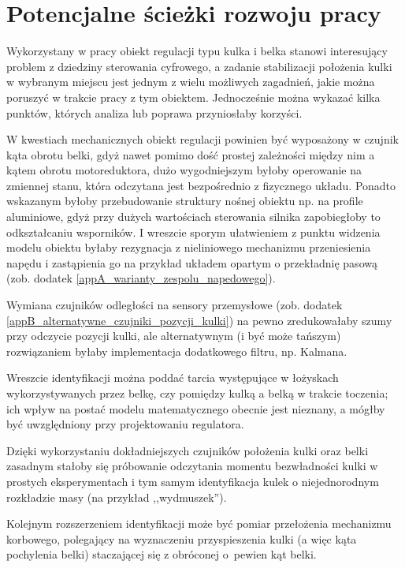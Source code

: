 \section{Potencjalne ścieżki rozwoju pracy}

Wykorzystany w pracy obiekt regulacji typu kulka i belka stanowi interesujący problem z dziedziny sterowania cyfrowego, a zadanie stabilizacji położenia kulki w wybranym miejscu jest jednym z wielu możliwych zagadnień, jakie można poruszyć w trakcie pracy z tym obiektem. Jednocześnie można wykazać kilka punktów, których analiza lub poprawa przyniosłaby korzyści.

W kwestiach mechanicznych obiekt regulacji powinien być wyposażony w czujnik kąta obrotu belki, gdyż nawet pomimo dość prostej zależności między nim a kątem obrotu motoreduktora, dużo wygodniejszym byłoby operowanie na zmiennej stanu, która odczytana jest bezpośrednio z fizycznego układu. Ponadto wskazanym byłoby przebudowanie struktury nośnej obiektu np. na profile aluminiowe, gdyż przy dużych wartościach sterowania silnika zapobiegłoby to odkształcaniu wsporników. I wreszcie sporym ułatwieniem z punktu widzenia modelu obiektu byłaby rezygnacja z nieliniowego mechanizmu przeniesienia napędu i zastąpienia go na przykład układem opartym o przekładnię pasową (zob. dodatek \ref{appA_warianty_zespolu_napedowego}).

Wymiana czujników odległości na sensory przemysłowe (zob. dodatek \ref{appB_alternatywne_czujniki_pozycji_kulki}) na pewno zredukowałaby szumy przy odczycie pozycji kulki, ale alternatywnym (i być może tańszym) rozwiązaniem byłaby implementacja dodatkowego filtru, np. Kalmana.

Wreszcie identyfikacji można poddać tarcia występujące w łożyskach wykorzystywanych przez belkę, czy pomiędzy kulką a belką w trakcie toczenia; ich wpływ na postać modelu matematycznego obecnie jest nieznany, a mógłby być uwzględniony przy projektowaniu regulatora.

Dzięki wykorzystaniu dokładniejszych czujników położenia kulki oraz belki zasadnym stałoby się próbowanie odczytania momentu bezwładności kulki w prostych eksperymentach i tym samym identyfikacja kulek o niejednorodnym rozkładzie masy (na przykład ,,wydmuszek'').

Kolejnym rozszerzeniem identyfikacji może być pomiar przełożenia mechanizmu korbowego, polegający na wyznaczeniu przyspieszenia kulki (a więc kąta pochylenia belki) staczającej się z obróconej o~pewien kąt belki.

